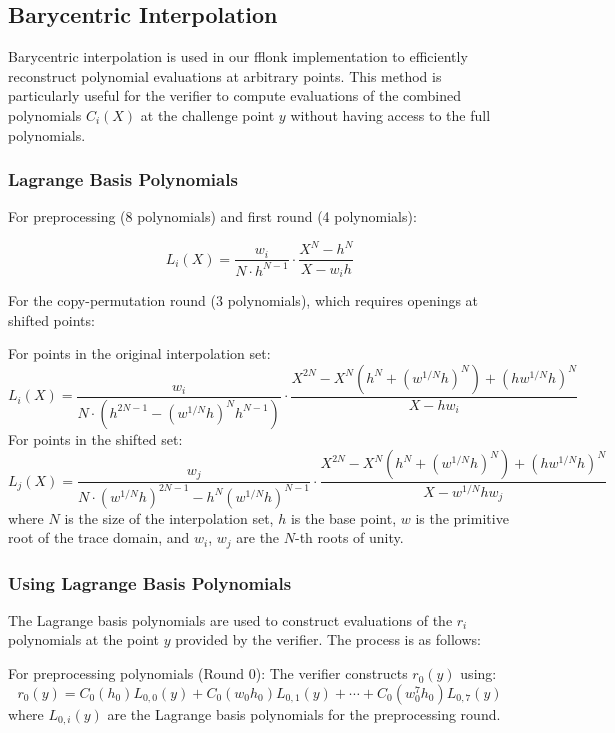 \documentclass[12pt,a4paper]{article}
\begin{document}
\subsection{Barycentric Interpolation}
Barycentric interpolation is used in our fflonk implementation to efficiently reconstruct polynomial evaluations at arbitrary points. This method is particularly useful for the verifier to compute evaluations of the combined polynomials $C_i(X)$ at the challenge point $y$ without having access to the full polynomials.
\subsubsection{Lagrange Basis Polynomials}

For preprocessing (8 polynomials) and first round (4 polynomials):

\begin{equation}
L_i(X) = \frac{w_i}{N \cdot h^{N-1}} \cdot \frac{X^N - h^N}{X - w_i h}
\end{equation}

For the copy-permutation round (3 polynomials), which requires openings at shifted points:

For points in the original interpolation set:
\begin{equation}
L_i(X) = \frac{w_i}{N \cdot (h^{2N-1} - (w^{1/N}h)^N h^{N-1})}\cdot \frac{X^{2N} - X^N(h^N + (w^{1/N}h)^N) + (h w^{1/N}h)^N}{X - h w_i}
\end{equation}
For points in the shifted set:
\begin{equation}
L_j(X) = \frac{w_j}{N \cdot (w^{1/N}h)^{2N-1} - h^N (w^{1/N}h)^{N-1}} \cdot \frac{X^{2N} - X^N(h^N + (w^{1/N}h)^N) + (h w^{1/N}h)^N}{X - w^{1/N}h w_j}
\end{equation}
where $N$ is the size of the interpolation set, $h$ is the base point, $w$ is the primitive root of the trace domain, and $w_i$, $w_j$ are the $N$-th roots of unity.
\subsubsection{Using Lagrange Basis Polynomials}

The Lagrange basis polynomials are used to construct evaluations of the $r_i$ polynomials at the point $y$ provided by the verifier. The process is as follows:

For preprocessing polynomials (Round 0):
The verifier constructs $r_0(y)$ using:
\begin{equation}
r_0(y) = C_0(h_0)L_{0,0}(y) + C_0(w_0h_0)L_{0,1}(y) + \cdots + C_0(w_0^7h_0)L_{0,7}(y)
\end{equation}
where $L_{0,i}(y)$ are the Lagrange basis polynomials for the preprocessing round.
\end{document}

